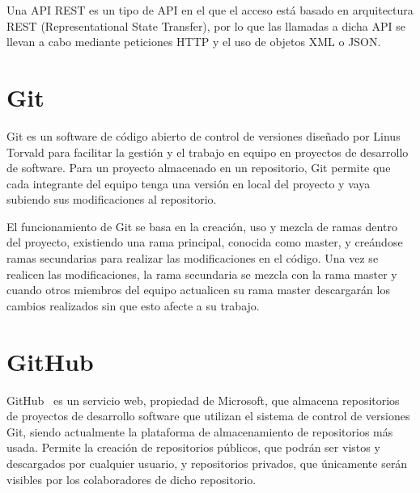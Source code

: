 \documentclass[a4paper, 12pt]{book}
\begin{document}
Una API REST es un tipo de API en el que el acceso está basado en arquitectura REST (Representational State Transfer), por lo que las llamadas a dicha API se llevan a cabo mediante peticiones HTTP y el uso de objetos XML o JSON.

\section{Git} 
\label{sec:git}

Git\cite{git} es un software de código abierto de control de versiones diseñado por Linus Torvald para facilitar la gestión y el trabajo en equipo en proyectos de desarrollo de software.
Para un proyecto almacenado en un repositorio, Git permite que cada integrante del equipo tenga una versión en local del proyecto y vaya subiendo sus modificaciones al repositorio.

El funcionamiento de Git se basa en la creación, uso y mezcla de ramas dentro del proyecto, existiendo una rama principal, conocida como master, y creándose ramas secundarias para realizar las modificaciones en el código. Una vez se realicen las modificaciones, la rama secundaria se mezcla con la rama master y cuando otros miembros del equipo actualicen su rama master descargarán los cambios realizados sin que esto afecte a su trabajo.

\section{GitHub} 
\label{sec:github}

GitHub~\cite{github} es un servicio web, propiedad de Microsoft, que almacena repositorios de proyectos de desarrollo software que utilizan el sistema de control de versiones Git, siendo actualmente la plataforma de almacenamiento de repositorios más usada. Permite la creación de repositorios públicos, que podrán ser vistos y descargados por cualquier usuario, y repositorios privados, que únicamente serán visibles por los colaboradores de dicho repositorio.
\end{document}
